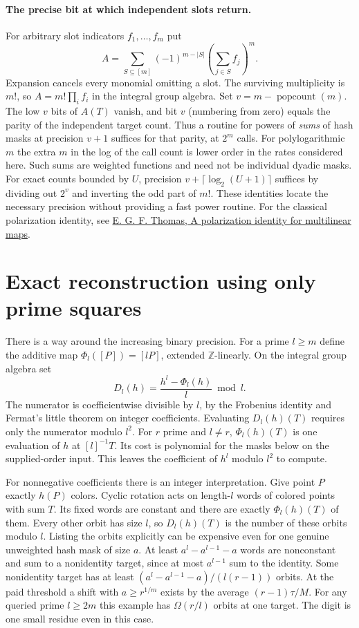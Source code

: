 \documentclass[11pt]{article}
\newcommand{\pc}{\operatorname{popcount}}
\begin{document}
\paragraph{The precise bit at which independent slots return.}
For arbitrary slot indicators $f_1,\ldots,f_m$ put
\[
 A=\sum_{S\subseteq[m]}(-1)^{m-|S|}
       \left(\sum_{j\in S} f_j\right)^m .
\]
Expansion cancels every monomial omitting a slot. The surviving
multiplicity is $m!$, so $A=m!\prod_i f_i$ in the integral group
algebra. Set $v=m-\pc(m)$. The low $v$ bits of $A(T)$ vanish, and
bit $v$ (numbering from zero) equals the parity of the independent
target count. Thus a routine for powers of \emph{sums} of hash masks
at precision $v+1$ suffices for that parity, at $2^m$ calls. For
polylogarithmic $m$ the extra $m$ in the log of the call count is
lower order in the rates considered here. Such sums are weighted
functions and need not be individual dyadic masks. For exact counts
bounded by $U$, precision $v+\lceil\log_2(U+1)\rceil$ suffices by
dividing out $2^v$ and inverting the odd part of $m!$. These identities
locate the necessary precision without providing a fast power routine.
For the classical polarization identity, see
\href{https://arxiv.org/abs/1309.1275}
{E. G. F. Thomas, A polarization identity for multilinear maps}.

\section{Exact reconstruction using only prime squares}
There is a way around the increasing binary precision. For a prime
$l\ge m$ define the additive map $\Phi_l([P])=[lP]$, extended
$\mathbb Z$-linearly. On the integral group algebra set
\[
        D_l(h)=\frac{h^l-\Phi_l(h)}{l}\bmod l .
\]
The numerator is coefficientwise divisible by $l$, by the Frobenius
identity and Fermat's little theorem on integer coefficients.
Evaluating $D_l(h)(T)$ requires only the numerator modulo $l^2$.
For $r$ prime and $l\ne r$, $\Phi_l(h)(T)$ is one evaluation of $h$
at $[l]^{-1}T$. Its cost is polynomial for the masks below on the
supplied-order input. This leaves the coefficient of $h^l$ modulo
$l^2$ to compute.

For nonnegative coefficients there is an integer interpretation. Give
point $P$ exactly $h(P)$ colors. Cyclic rotation acts on length-$l$
words of colored points with sum $T$. Its fixed words are constant
and there are exactly $\Phi_l(h)(T)$ of them. Every other orbit has
size $l$, so $D_l(h)(T)$ is the number of these orbits modulo $l$.
Listing the orbits explicitly can be expensive even for one genuine
unweighted hash mask of size $a$. At least $a^l-a^{l-1}-a$ words
are nonconstant and sum to a nonidentity target, since at most
$a^{l-1}$ sum to the identity. Some nonidentity target has at least
$(a^l-a^{l-1}-a)/(l(r-1))$ orbits. At the paid threshold a shift
with $a\ge r^{1/m}$ exists by the average $(r-1)\tau/M$. For any
queried prime $l\ge2m$ this example has $\Omega(r/l)$ orbits at
one target. The digit is one small residue even in this case.
\end{document}
